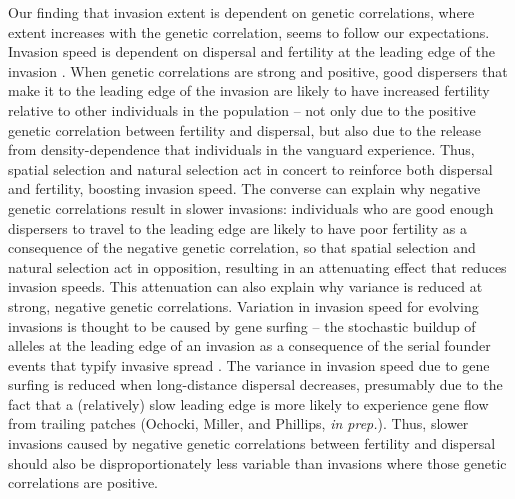 Our finding that invasion extent is dependent on genetic correlations, where extent increases with the genetic correlation, seems to follow our expectations. Invasion speed is dependent on dispersal and fertility at the leading edge of the invasion \citep{skellam_random_1951,okubo_diffusion_1980,kot_discrete-time_1986}. When genetic correlations are strong and positive, good dispersers that make it to the leading edge of the invasion are likely to have increased fertility relative to other individuals in the population -- not only due to the positive genetic correlation between fertility and dispersal, but also due to the release from density-dependence that individuals in the vanguard experience. Thus, spatial selection and natural selection act in concert to reinforce both dispersal and fertility, boosting invasion speed.  The converse can explain why negative genetic correlations result in slower invasions: individuals who are good enough dispersers to travel to the leading edge are likely to have poor fertility as a consequence of the negative genetic correlation, so that spatial selection and natural selection act in opposition, resulting in an attenuating effect that reduces invasion speeds. This attenuation can also explain why variance is reduced at strong, negative genetic correlations. Variation in invasion speed for evolving invasions is thought to be caused by gene surfing -- the stochastic buildup of alleles at the leading edge of an invasion as a consequence of the serial founder events that typify invasive spread \citep{edmonds_mutations_2004,klopfstein_fate_2006,excoffier_surfing_2008,peischl_expansion_2015,phillips_evolutionary_2015,ochocki_rapid_2017,weiss-lehman_rapid_2017}. The variance in invasion speed due to gene surfing is reduced when long-distance dispersal decreases, presumably due to the fact that a (relatively) slow leading edge is more likely to experience gene flow from trailing patches (Ochocki, Miller, and Phillips, \textit{in prep.}). Thus, slower invasions caused by negative genetic correlations between fertility and dispersal should also be disproportionately less variable than invasions where those genetic correlations are positive.

